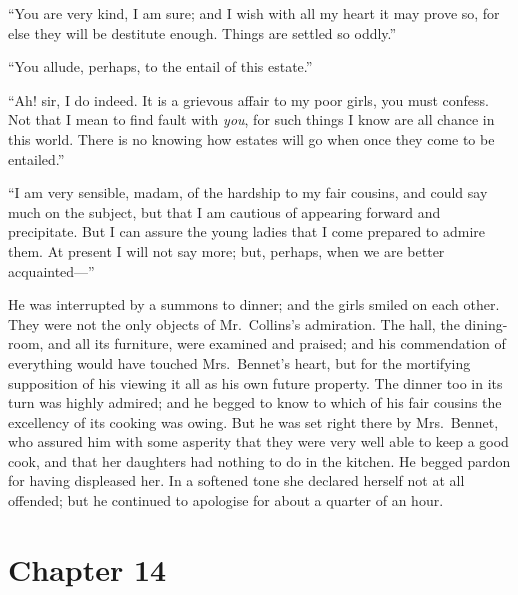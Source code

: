 ``You are very kind, I am sure; and I wish with all my heart it
may prove so, for else they will be destitute enough.  Things are
settled so oddly.''

``You allude, perhaps, to the entail of this estate.''

``Ah! sir, I do indeed.  It is a grievous affair to my poor girls,
you must confess.  Not that I mean to find fault with \emph{you}, for
such things I know are all chance in this world.  There is no
knowing how estates will go when once they come to be entailed.''

``I am very sensible, madam, of the hardship to my fair cousins,
and could say much on the subject, but that I am cautious of
appearing forward and precipitate.  But I can assure the young
ladies that I come prepared to admire them.  At present I will
not say more; but, perhaps, when we are better acquainted---''

He was interrupted by a summons to dinner; and the girls smiled
on each other.  They were not the only objects of Mr.\ Collins's
admiration.  The hall, the dining-room, and all its furniture,
were examined and praised; and his commendation of everything
would have touched Mrs.\ Bennet's heart, but for the mortifying
supposition of his viewing it all as his own future property.
The dinner too in its turn was highly admired; and he begged to
know to which of his fair cousins the excellency of its cooking
was owing.  But he was set right there by Mrs.\ Bennet, who
assured him with some asperity that they were very well able to
keep a good cook, and that her daughters had nothing to do in
the kitchen.  He begged pardon for having displeased her.  In a
softened tone she declared herself not at all offended; but he
continued to apologise for about a quarter of an hour.



\chapter{Chapter 14}


